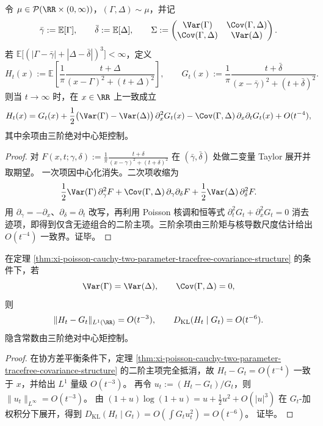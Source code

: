 \begin{theorem}\label{thm:xi-poisson-cauchy-two-parameter-tracefree-covariance-structure}
令 \(\mu\in\mathcal P(\RR\times(0,\infty))\)，\((\Gamma,\Delta)\sim\mu\)，并记
\[
\bar\gamma:=\mathbb E[\Gamma],\qquad
\bar\delta:=\mathbb E[\Delta],\qquad
\Sigma:=
\begin{pmatrix}
\Var(\Gamma) & \Cov(\Gamma,\Delta)\\
\Cov(\Gamma,\Delta) & \Var(\Delta)
\end{pmatrix}.
\]
若
\(
\mathbb E\!\bigl[(|\Gamma-\bar\gamma|+|\Delta-\bar\delta|)^3\bigr]<\infty
\)，定义
\[
H_t(x):=\mathbb E\!\left[\frac{1}{\pi}\frac{t+\Delta}{(x-\Gamma)^2+(t+\Delta)^2}\right],\qquad
G_t(x):=\frac{1}{\pi}\frac{t+\bar\delta}{(x-\bar\gamma)^2+(t+\bar\delta)^2}.
\]
则当 \(t\to\infty\) 时，在 \(x\in\RR\) 上一致成立
\[
H_t(x)=G_t(x)
+\frac12\bigl(\Var(\Gamma)-\Var(\Delta)\bigr)\,\partial_x^2 G_t(x)
-\Cov(\Gamma,\Delta)\,\partial_x\partial_t G_t(x)
+O(t^{-4}),
\]
其中余项由三阶绝对中心矩控制。
\end{theorem}
\begin{proof}
对
\(
F(x,t;\gamma,\delta):=\frac{1}{\pi}\frac{t+\delta}{(x-\gamma)^2+(t+\delta)^2}
\)
在 \((\bar\gamma,\bar\delta)\) 处做二变量 Taylor 展开并取期望。
一次项因中心化消失。二次项收缩为
\[
\frac12\Var(\Gamma)\,\partial_\gamma^2F
+\Cov(\Gamma,\Delta)\,\partial_\gamma\partial_\delta F
+\frac12\Var(\Delta)\,\partial_\delta^2F.
\]
用 \(\partial_\gamma=-\partial_x\)、\(\partial_\delta=\partial_t\) 改写，再利用 Poisson 核调和恒等式
\(
\partial_t^2G_t+\partial_x^2G_t=0
\)
消去迹项，即得到仅含无迹组合的二阶主项。三阶余项由三阶矩与核导数尺度估计给出 \(O(t^{-4})\) 一致界。证毕。
\end{proof}
\begin{corollary}[协方差平衡触发的超二阶信息塌缩]\label{cor:xi-poisson-cauchy-covariance-balance-supersecond-collapse}
在定理 \ref{thm:xi-poisson-cauchy-two-parameter-tracefree-covariance-structure} 的条件下，若
\[
\Var(\Gamma)=\Var(\Delta),\qquad
\Cov(\Gamma,\Delta)=0,
\]
则
\[
\|H_t-G_t\|_{L^1(\RR)}=O(t^{-3}),\qquad
D_{\mathrm{KL}}(H_t\mid G_t)=O(t^{-6}).
\]
隐含常数由三阶绝对中心矩控制。
\end{corollary}
\begin{proof}
在协方差平衡条件下，定理
\ref{thm:xi-poisson-cauchy-two-parameter-tracefree-covariance-structure}
的二阶主项完全抵消，故 \(H_t-G_t=O(t^{-4})\) 一致于 \(x\)，并给出 \(L^1\) 量级 \(O(t^{-3})\)。
再令 \(u_t:=(H_t-G_t)/G_t\)，则 \(\|u_t\|_{L^\infty}=O(t^{-3})\)。
由
\(
(1+u)\log(1+u)=u+\frac12u^2+O(|u|^3)
\)
在 \(G_t\)-加权积分下展开，得到
\(
D_{\mathrm{KL}}(H_t\mid G_t)=O(\int G_tu_t^2)=O(t^{-6})
\)。
证毕。
\end{proof}
